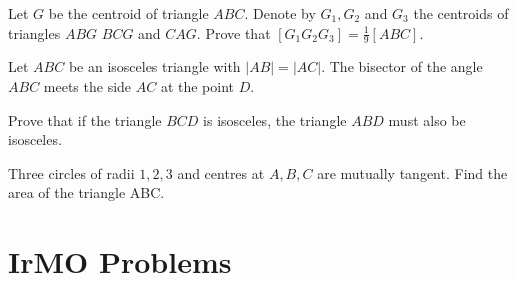 \documentclass{pset}
\begin{document}
\begin{problems}
\begin{problem}
    Let \(G\) be the centroid of triangle \(A B C .\) Denote by \(G_{1}, G_{2}\) and \(G_{3}\) the centroids of triangles \(A B G\) \(B C G\) and \(C A G .\) Prove that $\left[G_{1} G_{2} G_{3}\right]=\frac{1}{9}[A B C]$.
\end{problem}

\begin{problem}
    Let \(A B C\) be an isosceles triangle with \(|A B|=|A C| .\) The bisector of the angle \(A B C\) meets the side \(A C\) at the point \(D .\)
    
    Prove that if the triangle \(B C D\) is isosceles, the triangle \(A B D\) must also be isosceles.
\end{problem}

\begin{problem}
    Three circles of radii \(1,2,3\) and centres at \(A, B, C\) are mutually tangent. Find the area of the triangle ABC.
\end{problem}

\end{problems}

\clearpage

\section*{IrMO Problems}
\end{document}

